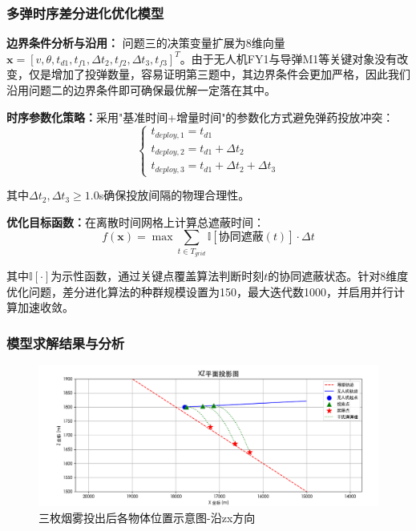 \documentclass[fontset=SimSun]{ctexart}
\begin{document}
\subsubsection{多弹时序差分进化优化模型}

\textbf{边界条件分析与沿用：}
问题三的决策变量扩展为8维向量$\mathbf{x} = [v, \theta, t_{d1}, t_{f1}, \Delta t_2, t_{f2}, \Delta t_3, t_{f3}]^T$。由于无人机FY1与导弹M1等关键对象没有改变，仅是增加了投弹数量，容易证明第三题中，其边界条件会更加严格，因此我们沿用问题二的边界条件即可确保最优解一定落在其中。

\textbf{时序参数化策略：}采用"基准时间+增量时间"的参数化方式避免弹药投放冲突：
\begin{equation}
\begin{cases}
t_{deploy,1} = t_{d1} \\
t_{deploy,2} = t_{d1} + \Delta t_2 \\
t_{deploy,3} = t_{d1} + \Delta t_2 + \Delta t_3
\end{cases}
\end{equation}

其中$\Delta t_2, \Delta t_3 \geq 1.0$s确保投放间隔的物理合理性。

\textbf{优化目标函数：}在离散时间网格上计算总遮蔽时间：
\begin{equation}
f(\mathbf{x}) = \max \sum_{t \in T_{grid}} \mathbb{I}[\text{协同遮蔽}(t)] \cdot \Delta t
\end{equation}

其中$\mathbb{I}[\cdot]$为示性函数，通过关键点覆盖算法判断时刻$t$的协同遮蔽状态。针对8维度优化问题，差分进化算法的种群规模设置为150，最大迭代数1000，并启用并行计算加速收敛。

\subsubsection{模型求解结果与分析}

\begin{figure}[H]
    \centering
    \includegraphics[width=\textwidth]{6.问题3中烟雾弹投掷zx方向视图.png}
    \caption{三枚烟雾投出后各物体位置示意图-沿zx方向}
    \label{fig:obscuration_cases}
\end{figure}
\end{document}
